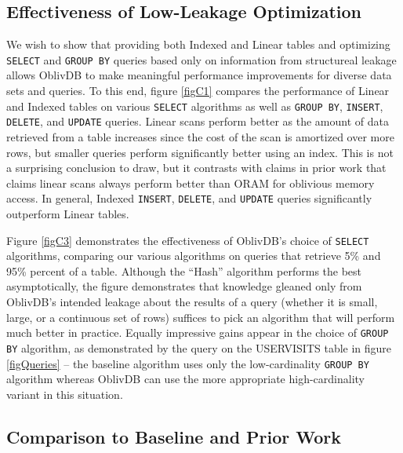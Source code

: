 \documentclass[conference]{IEEEtran}
\def\name/{OblivDB}
\begin{document}
\subsection{Effectiveness of Low-Leakage Optimization}
We wish to show that providing both Indexed and Linear tables and optimizing \texttt{SELECT} and \texttt{GROUP BY} queries based only on information from structureal leakage allows \name/ to make meaningful performance improvements for diverse data sets and queries. To this end, figure \ref{figC1} compares the performance of Linear and Indexed tables on various \texttt{SELECT} algorithms as well as \texttt{GROUP BY}, \texttt{INSERT}, \texttt{DELETE}, and \texttt{UPDATE} queries. Linear scans perform better as the amount of data retrieved from a table increases since the cost of the scan is amortized over more rows, but smaller queries perform significantly better using an index. This is not a surprising conclusion to draw, but it contrasts with claims in prior work \cite{RLT15} that claims linear scans always perform better than ORAM for oblivious memory access. In general, Indexed \texttt{INSERT}, \texttt{DELETE}, and \texttt{UPDATE} queries significantly outperform Linear tables.

Figure \ref{figC3} demonstrates the effectiveness of \name/'s choice of \texttt{SELECT} algorithms, comparing our various algorithms on queries that retrieve 5\% and 95\% percent of a table. Although the ``Hash'' algorithm performs the best asymptotically, the figure demonstrates that knowledge gleaned only from \name/'s intended leakage about the results of a query (whether it is small, large, or a continuous set of rows) suffices to pick an algorithm that will perform much better in practice. Equally impressive gains appear in the choice of \texttt{GROUP BY} algorithm, as demonstrated by the query on the USERVISITS table in figure \ref{figQueries} -- the baseline algorithm uses only the low-cardinality \texttt{GROUP BY} algorithm whereas \name/ can use the more appropriate high-cardinality variant in this situation. 

\subsection{Comparison to Baseline and Prior Work}
\end{document}
